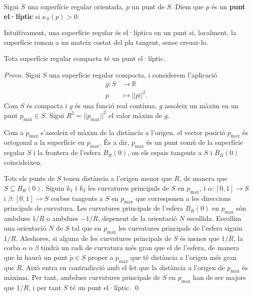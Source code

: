 \begin{defi}
    Sigui $S$ una superfície regular orientada, $p$ un punt de $S$. Diem que $p$ és un \textbf{punt el·líptic} si $\kappa_S(p) > 0$.
\end{defi}

Intuïtivament, una superfície regular és el·líptica en un punt si, localment, la superfície roman a un mateix costat del pla tangent, sense creuar-lo. 

\begin{teo}\label{teo:elliptic_point}
    Tota superfície regular compacta té un punt el·líptic.
\end{teo}
{
    \color{black}
    \textit{Prova.}
    Sigui $S$ una superfície regular compacta, i considerem l'aplicació 
    \begin{align*}
        g:S&\to\mathbb R\\
        p&\mapsto ||p||^2.
    \end{align*}
    Com $S$ és compacta i $g$ és una funció real contínua, $g$ assoleix un màxim en un punt $p_{\max}\in S$. Sigui $R^2 = ||p_{\max}||^2$ el valor màxim de $g$. 
    
    Com a $p_{\max}$ s'assoleix el màxim de la distància a l'origen, el vector posició $p_{\max}$ és ortogonal a la superfície en $p_{\max}$. És a dir, $p_{\max}$ és un punt comú de la superfície regular $S$ i la frontera de l'esfera $B_{R}(0)$, on els espais tangents a $S$ i $B_{R}(0)$ coincideixen. 

    Tots els punts de $S$ tenen distància a l'origen menor que $R$, de manera que $S\subseteq B_{R}(0)$. Siguin $k_1$ i $k_2$ les curvatures principals de $S$ en $p_{\max}$, i $\alpha:[0,1]\to S$ i $\beta:[0,1]\to S$ corbes tangents a $S$ en $p_{\max}$ que corresponen a les direccions principals de curvatura. Les curvatures principals de l'esfera $B_{R}(0)$ en $p_{\max}$ són ambdues $1/R$ o ambdues $-1/R$, depenent de la orientació $N$ escollida. Escollim una orientació $N$ de $S$ tal que en $p_{\max}$ les curvatures principals de l'esfera siguin $1/R$. Aleshores, si alguna de les curvatures principals de $S$ és menor que $1/R$, la corba $\alpha$ o $\beta$ tindrà un radi de curvatura més gran que el de l'esfera, de manera que hi haurà un punt $\tilde p\in S$ proper a $p_{\max}$ que té distància a l'origen més gran que $R$. Això entra en contradicció amb el fet que la distància a l'origen de $p_{\max}$ és màxima. Per tant, ambdues curvatures principals de $S$ en $p_{\max}$ han de ser majors que $1/R$, i per tant $S$ té un punt el·líptic.
    \qed
}

